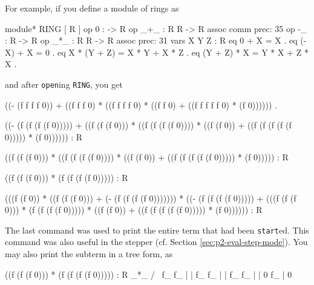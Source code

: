 \documentclass[a4paper]{memoir}
\begin{document}
For example, if you define a module of rings as\label{exs:ring}
\begin{vvtm}
\begin{ccode}
  module* RING {
    [ R ]
    op 0 : -> R
    op _+_ : R R -> R { assoc comm prec: 35 }
    op -_ : R -> R
    op _*_ : R R -> R { assoc prec: 31 }
    vars X Y Z : R
    eq 0 + X = X .
    eq (- X) + X = 0 .
    eq X * (Y + Z) = X * Y + X * Z .
    eq (Y + Z) * X = Y * X + Z * X .
  }
\end{ccode}
\end{vvtm}
and after \verb|open|ing \verb|RING|, you get
\begin{vvtm}
\begin{ccode}

      ((- (f f f f 0)) + ((f f f 0) * ((f f f f 0) *
                                   ((f f 0) + ((f f f f f 0) * (f 0)))))) .


  ((- (f (f (f (f 0))))) + ((f (f (f 0))) * ((f (f (f (f 0)))) * ((f (f 0)) + 
      ((f (f (f (f (f 0))))) * (f 0)))))) : R


  ((f (f (f 0))) * ((f (f (f (f 0)))) * ((f (f 0)) + ((f (f (f (f (f
      0))))) * (f 0))))) : R


  ((f (f (f 0))) * (f (f (f (f 0))))) : R

  (((f (f 0)) * ((f (f (f 0))) + (- (f (f (f (f 0))))))) * ((- (f (f 
      (f (f 0))))) + (((f (f (f 0))) * (f (f (f (f 0))))) * ((f (f 
      0)) + ((f (f (f (f (f 0))))) * (f 0)))))) : R

\end{ccode}
\end{vvtm}
The last command was used to print the entire term that had been
\verb|start|ed. This command was
also useful in the stepper (cf. Section \ref{sec:p2-eval-step-mode}).
You may also print the subterm in a tree form, as
\begin{vvtm}
\begin{ccode}
  ((f (f (f 0))) * (f (f (f (f 0))))) : R
        _*_ 
       /   \ 
      f_  f_
       |   | 
      f_  f_
       |   | 
      f_  f_
       |   | 
       0  f_
           | 
           0
           
    

\end{ccode}
\end{vvtm}
\end{document}
